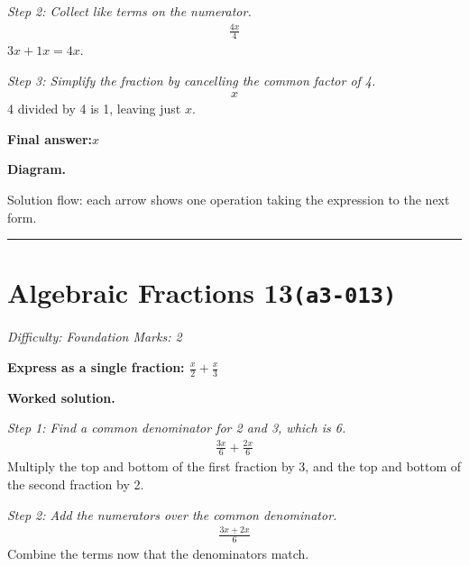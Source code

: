 \documentclass[11pt]{article}
\newcommand{\question}[1]{\par\medskip\noindent\textbf{#1}\par}
\begin{document}
\textit{Step 2: Collect like terms on the numerator.}
\[\begin{gathered}
\frac{4x}{4}
\end{gathered}\]
\( 3x + 1x = 4x \).

\textit{Step 3: Simplify the fraction by cancelling the common factor of 4.}
\[\begin{gathered}
x
\end{gathered}\]
4 divided by 4 is 1, leaving just \( x \).

\begin{answerbox}
\textbf{Final answer:}\quad \(\displaystyle x\)
\end{answerbox}
\textbf{Diagram.}

\begin{center}
\end{center}
\small Solution flow: each arrow shows one operation taking the expression to the next form.\normalsize

\medskip\hrule

\section*{Algebraic Fractions 13\quad\small\texttt{(a3-013)}}
\textit{Difficulty: Foundation \quad\textbar\quad Marks: 2}

\question{Express as a single fraction: \( \frac{x}{2} + \frac{x}{3} \)}

\textbf{Worked solution.}

\textit{Step 1: Find a common denominator for 2 and 3, which is 6.}
\[\begin{gathered}
\frac{3x}{6} + \frac{2x}{6}
\end{gathered}\]
Multiply the top and bottom of the first fraction by 3, and the top and bottom of the second fraction by 2.

\textit{Step 2: Add the numerators over the common denominator.}
\[\begin{gathered}
\frac{3x + 2x}{6}
\end{gathered}\]
Combine the terms now that the denominators match.
\end{document}
